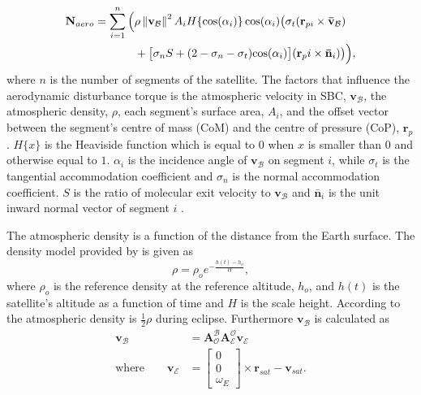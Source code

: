 \begin{equation}
\begin{aligned}
\mathbf{N}_{aero} = \sum_{i=1}^{n}\Big(& \rho \norm{\mathbf{v}_{\mathcal{B}}}^2 A_i H \{\text{cos}(\alpha_i)\} \, \text{cos}(\alpha_i) \big(\sigma_t (\mathbf{r}_{pi} \times \mathbf{\bar{v}}_{\mathcal{B}}) \\
					 & + \big[ \sigma_nS + (2 - \sigma_n - \sigma_t) \text{cos}(\alpha_i)\big] (\mathbf{r}_pi \times \mathbf{\bar{n}}_i) \big) \vphantom{\norm{\mathbf{v}_{\mathcal{B}}}^2}\Big),
\end{aligned}
\end{equation}
where $n$ is the number of segments of the satellite. The factors that influence the aerodynamic disturbance torque is the atmospheric velocity in SBC, $\mathbf{v}_{\mathcal{B}}$, the atmospheric density, $\rho$, each segment's surface area, $A_i$, and the offset vector between the segment's centre of mass (CoM) and the centre of pressure (CoP), $\mathbf{r}_p$. $H\{x\}$ is the Heaviside function which is equal to $0$ when $x$ is smaller than $0$ and otherwise equal to $1$. $\alpha_i$ is the incidence angle of $\mathbf{v}_{\mathcal{B}}$ on segment $i$, while $\sigma_t$ is the tangential accommodation coefficient and $\sigma_n$ is the normal accommodation coefficient. $S$ is the ratio of molecular exit velocity to $\mathbf{v}_{\mathcal{B}}$ and $\mathbf{\bar{n}}_i$ is the unit inward normal vector of segment $i$ \cite{JansevanVuuren2015}.

The atmospheric density is a function of the distance from the Earth surface. The density model provided by \cite{vallado2001fundamentals} is given as 
\begin{equation}
\rho = \rho_o e^{-\frac{h(t)-h_o}{H}},
\end{equation}
where $\rho_o$ is the reference density at the reference altitude, $h_o$, and $h(t)$ is the satellite's altitude as a function of time and $H$ is the scale height. According to \cite{steyn2011CubeSat} the atmospheric density is $\frac{1}{2}\rho$ during eclipse. Furthermore $\mathbf{v}_{\mathcal{B}}$ is calculated as
\begin{equation}
\begin{aligned}
\mathbf{v}_{\mathcal{B}} &= \boldsymbol{A}_{\mathcal{O}}^{\mathcal{B}} \boldsymbol{A}_{\mathcal{E}}^{\mathcal{O}} \mathbf{v}_{\mathcal{E}} \\
\text{where}  \qquad \mathbf{v}_{\mathcal{E}} &= \begin{bmatrix} 0 \\ 0 \\ \omega_E \end{bmatrix} \times \mathbf{r}_{sat} - \mathbf{v}_{sat}.
\end{aligned}
\end{equation}

